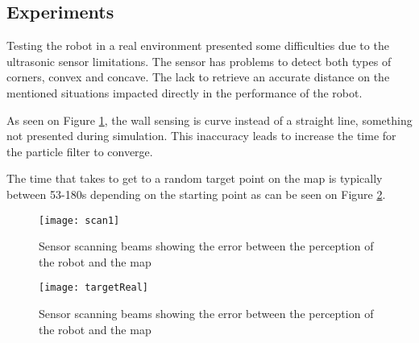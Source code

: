 \subsection{Experiments}

Testing the robot in a real environment presented some difficulties due to the  ultrasonic sensor limitations. The sensor has problems to detect both types of corners, convex and concave. The lack to retrieve an accurate distance on the mentioned situations impacted directly in the performance of the robot.

As seen on Figure \ref{fig:scan1}, the wall sensing is curve instead of a straight line, something not presented during simulation. This inaccuracy leads to increase the time for the particle filter to converge.
	
The time that takes to get to a random target point on the map is typically between 53-180s depending on the starting point as can be seen on Figure \ref{fig:targetReal}. 
	
		\begin{figure}[h]
			\centering
			\texttt{[image: scan1]}
			\caption{Sensor scanning beams showing the error between the perception of the robot and the map}
			\label{fig:scan1}
		\end{figure}

		\begin{figure}[h]
			\centering
			\texttt{[image: targetReal]}
			\caption{Sensor scanning beams showing the error between the perception of the robot and the map}
			\label{fig:targetReal}
		\end{figure}	